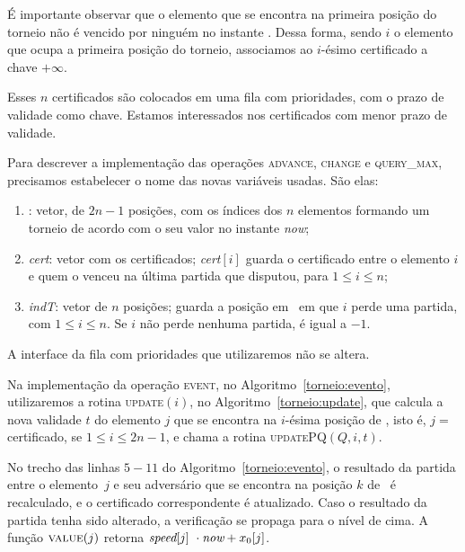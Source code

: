 É importante observar que o elemento que se encontra na primeira posição do torneio não é vencido
por ninguém no instante \now.
Dessa forma, sendo $i$ o elemento que ocupa a primeira posição do torneio, associamos ao $i$-ésimo
certificado a chave $+\infty$.



Esses $n$ certificados são colocados em uma fila com prioridades, com o prazo de validade como
chave.
Estamos interessados nos certificados com menor prazo de validade.

Para descrever a implementação das operações \textsc{advance}, \textsc{change} e \textsc{query\_max}, precisamos estabelecer o nome das novas variáveis usadas.
São elas:
\begin{enumerate}
    \item \torneio: vetor, de $2n - 1$ posições, com os índices dos
    $n$ elementos formando um torneio de acordo com o seu valor no
    instante \textit{now};

    \item \textit{cert}: vetor com os certificados;
    \textit{cert}$[i]$ guarda o certificado entre o elemento $i$ e
    quem o venceu na última partida que disputou, para $1 \leq i \leq n$;

    \item \textit{indT}: vetor de $n$ posições; \indt[$i$] guarda a
    posição em \torneio~em que $i$ perde uma partida, com $1 \leq i
    \leq n$.
    Se $i$ não perde nenhuma partida, \indt[$i$] é igual a $-1$.
\end{enumerate}

A interface da fila com prioridades que utilizaremos não se altera.

Na implementação da operação \textsc{event}, no Algoritmo~\ref{torneio:evento}, utilizaremos a
rotina \textsc{update}$(i)$, no Algoritmo~\ref{torneio:update}, que calcula a nova validade $t$ do
elemento $j$ que se encontra na $i$-ésima posição de \torneio, isto é, $j =~$\torneio[$i$]
certificado, se $1 \leq i \leq 2n - 1$, e chama a rotina \textsc{updatePQ}$(Q, i, t)$.





No trecho das linhas $5 - 11$ do Algoritmo~\ref{torneio:evento}, o resultado da partida entre o
elemento~$j$ e seu adversário que se encontra na posição $k$ de \torneio~é recalculado, e o
certificado correspondente é atualizado.
Caso o resultado da partida tenha sido alterado, a verificação se propaga para o nível de cima.
A função $\Call{value}{j}$ retorna ${\textit{speed}[j]~\cdot\textit{now} + x_0[j]}$.

